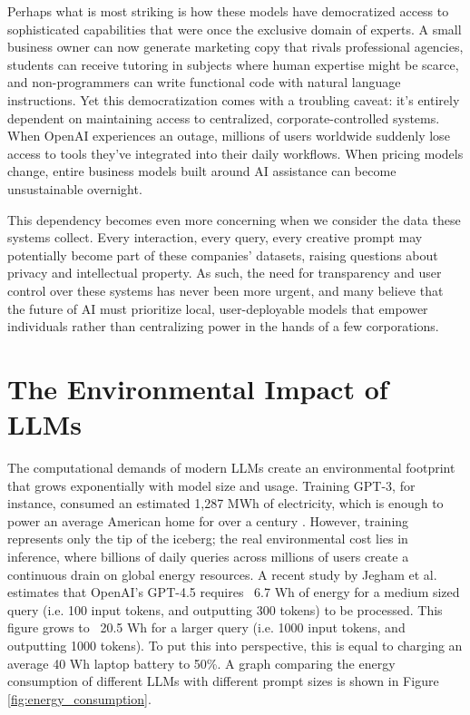 Perhaps what is most striking is how these models have democratized access to sophisticated capabilities that were once the exclusive domain of experts. A small business owner can now generate marketing copy that rivals professional agencies, students can receive tutoring in subjects where human expertise might be scarce, and non-programmers can write functional code with natural language instructions. Yet this democratization comes with a troubling caveat: it's entirely dependent on maintaining access to centralized, corporate-controlled systems. When OpenAI experiences an outage, millions of users worldwide suddenly lose access to tools they've integrated into their daily workflows. When pricing models change, entire business models built around AI assistance can become unsustainable overnight.

This dependency becomes even more concerning when we consider the data these systems collect. Every interaction, every query, every creative prompt may potentially become part of these companies' datasets, raising questions about privacy and intellectual property.
As such, the need for transparency and user control over these systems has never been more urgent, and many believe that the future of AI must prioritize local, user-deployable models that empower individuals rather than centralizing power in the hands of a few corporations.

\section{The Environmental Impact of LLMs}

The computational demands of modern LLMs create an environmental footprint that grows exponentially with model size and usage. Training GPT-3, for instance, consumed an estimated 1,287 MWh of electricity, which is enough to power an average American home for over a century \cite{gpt_energy}. However, training represents only the tip of the iceberg; the real environmental cost lies in inference, where billions of daily queries across millions of users create a continuous drain on global energy resources. A recent study by Jegham et al. \cite{hungry_ai} estimates that OpenAI's GPT-4.5 requires ~6.7 Wh of energy for a medium sized query (i.e. 100 input tokens, and outputting 300 tokens) to be processed. This figure grows to ~20.5 Wh for a larger query (i.e. 1000 input tokens, and outputting 1000 tokens). To put this into perspective, this is equal to charging an average 40 Wh laptop battery to 50\%. A graph comparing the energy consumption of different LLMs with different prompt sizes is shown in Figure \ref{fig:energy_consumption}.

